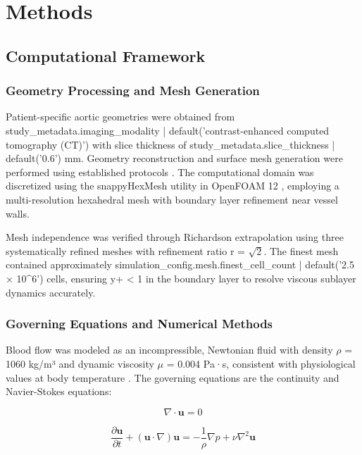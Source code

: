 
\section{Methods}

\subsection{Computational Framework}

\subsubsection{Geometry Processing and Mesh Generation}
Patient-specific aortic geometries were obtained from {{ study_metadata.imaging_modality | default('contrast-enhanced computed tomography (CT)') }} with slice thickness of {{ study_metadata.slice_thickness | default('0.6') }} mm. Geometry reconstruction and surface mesh generation were performed using established protocols \cite{ref_geometry_processing}. The computational domain was discretized using the snappyHexMesh utility in OpenFOAM 12 \cite{openfoam_user_guide}, employing a multi-resolution hexahedral mesh with boundary layer refinement near vessel walls.

Mesh independence was verified through Richardson extrapolation using three systematically refined meshes with refinement ratio r = $\sqrt{2}$. The finest mesh contained approximately {{ simulation_config.mesh.finest_cell_count | default('2.5 × 10^6') }} cells, ensuring y+ < 1 in the boundary layer to resolve viscous sublayer dynamics accurately.

\subsubsection{Governing Equations and Numerical Methods}
Blood flow was modeled as an incompressible, Newtonian fluid with density $\rho$ = 1060 kg/m³ and dynamic viscosity $\mu$ = 0.004 Pa·s, consistent with physiological values at body temperature \cite{ref_blood_properties}. The governing equations are the continuity and Navier-Stokes equations:

\begin{equation}
\nabla \cdot \mathbf{u} = 0
\end{equation}

\begin{equation}
\frac{\partial \mathbf{u}}{\partial t} + (\mathbf{u} \cdot \nabla)\mathbf{u} = -\frac{1}{\rho}\nabla p + \nu \nabla^2 \mathbf{u}
\end{equation}

